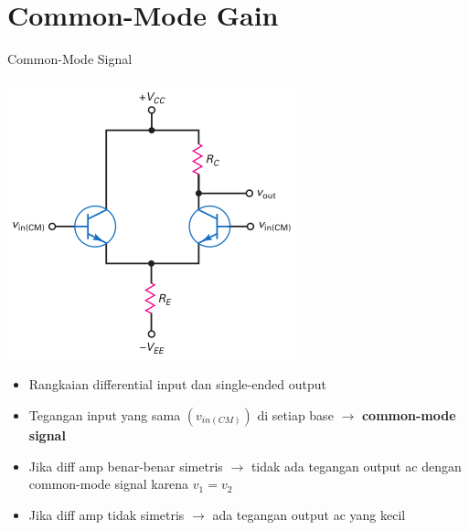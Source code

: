 \documentclass[aspectratio=169]{beamer}
\begin{document}
\section{Common-Mode Gain}
\begin{frame}{Common-Mode Signal}
	\begin{multicols}{2}
		\begin{center}
			\includegraphics[height=0.7\textheight]{gambar/01.diff-amp/01.common-mode_input_signal}
		\end{center}
		\columnbreak
		\begin{itemize}
			\item Rangkaian differential input dan single-ended output
			\item Tegangan input yang sama $( v_{in(CM)} )$ di setiap base $ \rightarrow $ \textbf{common-mode signal}
			\item Jika diff amp benar-benar simetris $ \rightarrow $ tidak ada tegangan output ac dengan common-mode signal karena $ v_1 = v_2 $
			\item Jika diff amp tidak simetris $ \rightarrow $ ada tegangan output ac yang kecil
		\end{itemize}
	\end{multicols}
\end{frame}
\end{document}
